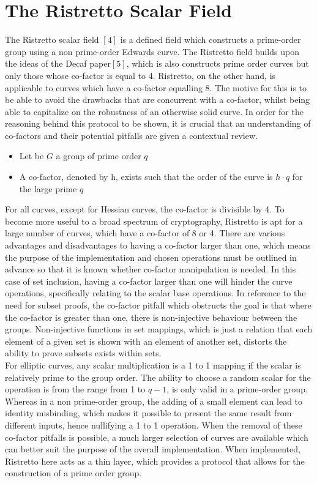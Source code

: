 \documentclass{article}
\begin{document}
\section{The Ristretto Scalar Field}
The Ristretto scalar field $[4]$ is a defined field which constructs a prime-order group using a non prime-order Edwards curve. The Ristretto field builds upon the ideas of the Decaf paper$[5]$, which is also constructs prime order curves but only those whose co-factor is equal to 4. Ristretto, on the other hand, is applicable to curves which have a co-factor equalling 8. The motive for this is to be able to avoid the drawbacks that are concurrent with a co-factor, whilst being able to capitalize on the robustness of an otherwise solid curve. In order for the reasoning behind this protocol to be shown, it is crucial that an understanding of co-factors and their potential pitfalls are given a contextual review. \\
\begin{itemize}
    \item Let be $G$ a group of prime order $q$ 
    \item  A co-factor, denoted by h, exists such that the order of the curve is $h \cdot q$ for the large prime $q$ 
\end{itemize} 
\hfill \break
For all curves, except for Hessian curves, the co-factor is divisible by 4. To become more useful to a broad spectrum of cryptography, Ristretto is apt for a large number of curves, which have a co-factor of 8 or 4. There are various advantages and disadvantages to having a co-factor larger than one, which means the purpose of the implementation and chosen operations must be outlined in advance so that it is known whether co-factor manipulation is needed. In this case of set inclusion, having a co-factor larger than one will hinder the curve operations, specifically relating to the scalar base operations. In reference to the need for subset proofs, the co-factor pitfall which obstructs the goal is that where the co-factor is greater than one, there is non-injective behaviour between the groups. Non-injective functions in set mappings, which is just a relation that each element of a given set is shown with an element of another set, distorts the ability to prove subsets exists within sets. \\
For elliptic curves, any scalar multiplication is a 1 to 1 mapping if the scalar is relatively prime to the group order. The ability to choose a random scalar for the operation is from the range from 1 to $q-1$, is only valid in a prime-order group. Whereas in a non prime-order group, the adding of a small element can lead to identity misbinding, which makes it possible to present the same result from different inputs, hence nullifying a 1 to 1 operation. When the removal of these co-factor pitfalls is possible, a much larger selection of curves are available which can better suit the purpose of the overall implementation. When implemented, Ristretto here acts as a thin layer, which provides a protocol that allows for the construction of a prime order group.  \\\\
\end{document}
